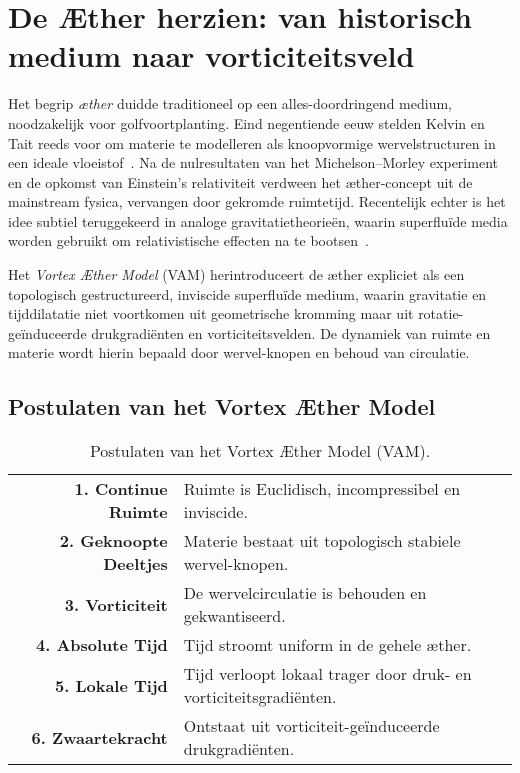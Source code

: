 \section*{De Æther herzien: van historisch medium naar vorticiteitsveld}

Het begrip \textit{æther} duidde traditioneel op een alles-doordringend medium, noodzakelijk voor golfvoortplanting. Eind negentiende eeuw stelden Kelvin en Tait reeds voor om materie te modelleren als knoopvormige wervelstructuren in een ideale vloeistof~\cite{thomson1867treatise}. Na de nulresultaten van het Michelson--Morley experiment en de opkomst van Einstein's relativiteit verdween het æther-concept uit de mainstream fysica, vervangen door gekromde ruimtetijd. Recentelijk echter is het idee subtiel teruggekeerd in analoge gravitatietheorieën, waarin superfluïde media worden gebruikt om relativistische effecten na te bootsen~\cite{barcelo2011analogue, volovik2009universe}.

Het \textit{Vortex Æther Model} (VAM) herintroduceert de æther expliciet als een topologisch gestructureerd, inviscide superfluïde medium, waarin gravitatie en tijddilatatie niet voortkomen uit geometrische kromming maar uit rotatie-geïnduceerde drukgradiënten en vorticiteitsvelden. De dynamiek van ruimte en materie wordt hierin bepaald door wervel-knopen en behoud van circulatie.

\subsection*{Postulaten van het Vortex Æther Model}

\begin{table}[h!]
    \centering
    \begin{tabular}{rl}
        \midrule
        \hline
        \textbf{1. Continue Ruimte} & Ruimte is Euclidisch, incompressibel en inviscide. \\
        \textbf{2. Geknoopte Deeltjes} & Materie bestaat uit topologisch stabiele wervel-knopen. \\
        \textbf{3. Vorticiteit} & De wervelcirculatie is behouden en gekwantiseerd. \\
        \textbf{4. Absolute Tijd} & Tijd stroomt uniform in de gehele æther. \\
        \textbf{5. Lokale Tijd} & Tijd verloopt lokaal trager door druk- en vorticiteitsgradiënten. \\
        \textbf{6. Zwaartekracht} & Ontstaat uit vorticiteit-geïnduceerde drukgradiënten. \\
        \hline
        \bottomrule
    \end{tabular}
    \caption{Postulaten van het Vortex Æther Model (VAM).}
    \label{tab:postulaten}
\end{table}

